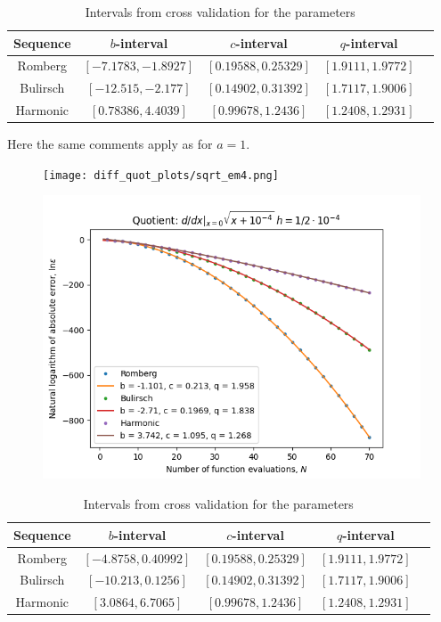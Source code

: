 \begin{table}[H]
    \centering
    \begin{tabular}{c|c||c|c|c}
Sequence & \(b\)-interval & \(c\)-interval & \(q\)-interval\\\hline\hline
Romberg &\([-7.1783, -1.8927]\) & \([0.19588, 0.25329]\) & \([1.9111, 1.9772]\)\\
Bulirsch & \([-12.515, -2.177]\) & \([0.14902, 0.31392]\) & \([1.7117, 1.9006]\)\\
Harmonic & \([0.78386, 4.4039]\) & \([0.99678, 1.2436]\) & \([1.2408, 1.2931]\)\\
    \end{tabular}
    \caption{Intervals from cross validation for the parameters}
    \label{tab:my_label}
\end{table}

Here the same comments apply as for \(a = 1\). 

\begin{figure}[H]
\centering
\begin{minipage}{0.45\textwidth}
\centering
\texttt{[image: diff\_quot\_plots/sqrt\_em4.png]}
\end{minipage}
\begin{minipage}{0.45\textwidth}
\centering
\includegraphics[scale=0.45]{diff_quot_plots/sqrt_em4_hp_trend.png}
\end{minipage}
\end{figure}

\begin{table}[H]
    \centering
    \begin{tabular}{c|c||c|c|c}
Sequence & \(b\)-interval & \(c\)-interval & \(q\)-interval\\\hline\hline
Romberg &\([-4.8758, 0.40992]\) & \([0.19588, 0.25329]\) & \([1.9111, 1.9772]\)\\
Bulirsch & \([-10.213, 0.1256]\) & \([0.14902, 0.31392]\) & \([1.7117, 1.9006]\)\\
Harmonic & \([3.0864, 6.7065]\) & \([0.99678, 1.2436]\) & \([1.2408, 1.2931]\)\\
    \end{tabular}
    \caption{Intervals from cross validation for the parameters}
    \label{tab:my_label}
\end{table}

